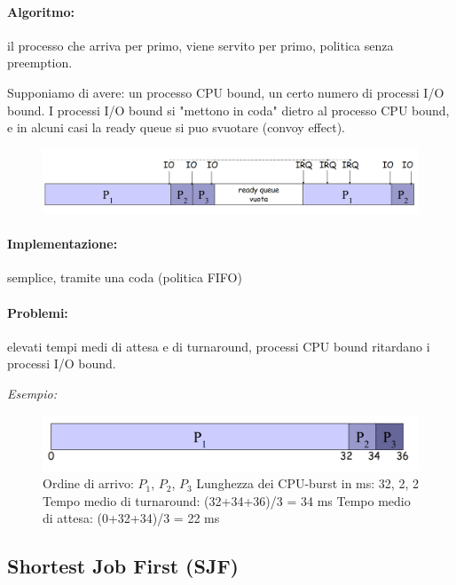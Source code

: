 \paragraph{Algoritmo:} il processo che arriva per primo, viene servito per primo, politica senza preemption.

Supponiamo di avere: un processo CPU bound, un certo numero di processi I/O bound. 
I processi I/O bound si "mettono in coda" dietro al processo CPU bound, e in alcuni casi la ready queue si puo svuotare (convoy effect).

\begin{figure} [h]
    \centering
    \includegraphics[width=0.5\linewidth]{Images/Screenshot 2024-12-23 at 14-30-35 so-02.1-scheduling - so-02.1-scheduling.pdf.png}
\end{figure}

\paragraph{Implementazione:} semplice, tramite una coda (politica FIFO)
\paragraph{Problemi:} elevati tempi medi di attesa e di turnaround, processi CPU bound ritardano i processi I/O bound.

\textit{Esempio:}
\begin{figure} [h]
    \centering
    \includegraphics[width=0.5\linewidth]{Images/Screenshot 2024-12-23 at 14-25-16 so-02.1-scheduling - so-02.1-scheduling.pdf.png}
    \caption{Ordine di arrivo: $P_1$, $P_2$, $P_3$
\newline
Lunghezza dei CPU-burst in ms: 32, 2, 2
\newline
Tempo medio di turnaround: (32+34+36)/3 = 34 ms
\newline
Tempo medio di attesa: (0+32+34)/3 = 22 ms}
\end{figure}

\subsection{Shortest Job First (SJF)}
